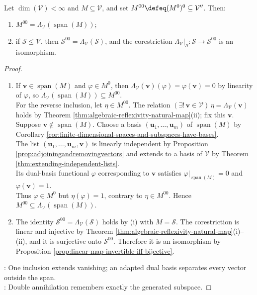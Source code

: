 \begin{theorem} \label{thm:double-annihilator-finite-dimensional} \\
Let $\dim(\mathcal{V})<\infty$ and $M\subseteq\mathcal{V}$, and set $M^{00}\defeq(M^0)^0\subseteq\mathcal{V}''$. Then:
\begin{enumerate}[label=(\roman*)]
\setlength{\itemsep}{0pt}
\item $M^{00}=\Lambda_{\mathcal{V}}(\operatorname{span}(M))$;
\item if $\mathcal{S}\leq\mathcal{V}$, then $\mathcal{S}^{00}=\Lambda_{\mathcal{V}}(\mathcal{S})$, and the corestriction $\Lambda_{\mathcal{V}}|_{\mathcal{S}}:\mathcal{S}\to\mathcal{S}^{00}$ is an isomorphism.
\end{enumerate}
\begin{proof}
\begin{enumerate}[label=(\roman*)]
\setlength{\itemsep}{0pt}
\item If $\mathbf{v}\in\operatorname{span}(M)$ and $\varphi\in M^0$, then $\Lambda_{\mathcal{V}}(\mathbf{v})(\varphi)=\varphi(\mathbf{v})=0$ by linearity of $\varphi$, so $\Lambda_{\mathcal{V}}(\operatorname{span}(M))\subseteq M^{00}$.\\
For the reverse inclusion, let $\eta\in M^{00}$. The relation $(\exists!\,\mathbf{v}\in\mathcal{V})\,\eta=\Lambda_{\mathcal{V}}(\mathbf{v})$ holds by Theorem \ref{thm:algebraic-reflexivity-natural-map}(ii); fix this $\mathbf{v}$.\\
Suppose $\mathbf{v}\notin\operatorname{span}(M)$. Choose a basis $(\mathbf{u}_1,\ldots,\mathbf{u}_m)$ of $\operatorname{span}(M)$ by Corollary \ref{cor:finite-dimensional-spaces-and-subspaces-have-bases}.\\
The list $(\mathbf{u}_1,\ldots,\mathbf{u}_m,\mathbf{v})$ is linearly independent by Proposition \ref{prop:adjoiningandremovingvectors} and extends to a basis of $\mathcal{V}$ by Theorem \ref{thm:extending-independent-lists}.\\
Its dual-basis functional $\varphi$ corresponding to $\mathbf{v}$ satisfies $\varphi|_{\operatorname{span}(M)}=0$ and $\varphi(\mathbf{v})=1$.\\
Thus $\varphi\in M^0$ but $\eta(\varphi)=1$, contrary to $\eta\in M^{00}$. Hence $M^{00}\subseteq\Lambda_{\mathcal{V}}(\operatorname{span}(M))$.
\item The identity $\mathcal{S}^{00}=\Lambda_{\mathcal{V}}(\mathcal{S})$ holds by (i) with $M=\mathcal{S}$. The corestriction is linear and injective by Theorem \ref{thm:algebraic-reflexivity-natural-map}(i)--(ii), and it is surjective onto $\mathcal{S}^{00}$. Therefore it is an isomorphism by Proposition \ref{prop:linear-map-invertible-iff-bijective}.
\end{enumerate}
: One inclusion extends vanishing; an adapted dual basis separates every vector outside the span.\\
: Double annihilation remembers exactly the generated subspace.
\end{proof}
\end{theorem}


